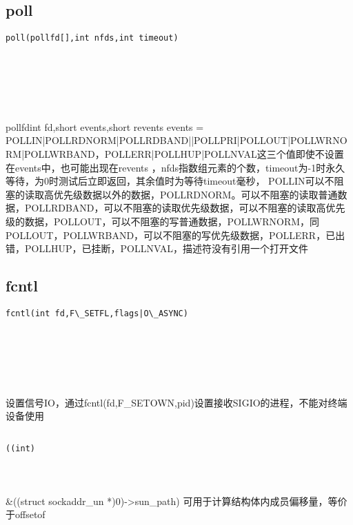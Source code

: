 \documentclass[10pt,a4paper]{article}
\begin{document}
\subsection{poll}
\begin{spacing}{2.0}
\lstset{language=C,numbers=none}
\begin{lstlisting}
poll(pollfd[],int nfds,int timeout)
\end{lstlisting}
{\large\color[rgb]{0.2,0.4,0.6}{pollfd[]:}} \\
{\large\color[rgb]{0.2,0.4,0.6}{nfds:}} \\
{\large\color[rgb]{0.2,0.4,0.6}{timeout:}}
\paragraph{ \ \ }pollfd{int fd,short events,short revents} events = POLLIN|POLLRDNORM|POLLRDBAND||POLLPRI|POLLOUT|POLLWRNORM|POLLWRBAND，POLLERR|POLLHUP|POLLNVAL这三个值即使不设置在events中，也可能出现在revents ，nfds指数组元素的个数，timeout为-1时永久等待，为0时测试后立即返回，其余值时为等待timeout毫秒， POLLIN可以不阻塞的读取高优先级数据以外的数据，POLLRDNORM。可以不阻塞的读取普通数据，POLLRDBAND，可以不阻塞的读取优先级数据，可以不阻塞的读取高优先级的数据，POLLOUT，可以不阻塞的写普通数据，POLLWRNORM，同POLLOUT，POLLWRBAND，可以不阻塞的写优先级数据，POLLERR，已出错，POLLHUP，已挂断，POLLNVAL，描述符没有引用一个打开文件
\end{spacing}

\subsection{fcntl}
\begin{spacing}{2.0}
\lstset{language=C,numbers=none}
\begin{lstlisting}
fcntl(int fd,F\_SETFL,flags|O\_ASYNC)
\end{lstlisting}
{\large\color[rgb]{0.2,0.4,0.6}{fd:}} \\
{\large\color[rgb]{0.2,0.4,0.6}{F\_SETFL:}} \\
{\large\color[rgb]{0.2,0.4,0.6}{flags|O\_ASYNC:}}
\paragraph{ \ \ }设置信号IO，通过fcntl(fd,F\_SETOWN,pid)设置接收SIGIO的进程，不能对终端设备使用
\end{spacing}

\subsection{}
\begin{spacing}{2.0}
\lstset{language=C,numbers=none}
\begin{lstlisting}
((int)
\end{lstlisting}
{\large\color[rgb]{0.2,0.4,0.6}{(int:}}
\paragraph{ \ \ }\&((struct sockaddr\_un *)0)->sun\_path) 可用于计算结构体内成员偏移量，等价于offsetof
\end{spacing}

\end{document}
